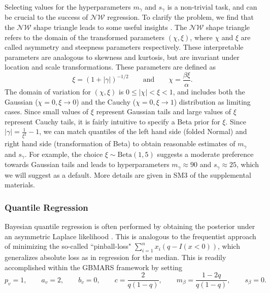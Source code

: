 \documentclass{article} %
\newcommand{\NIG}{\mathcal{NW}}
\begin{document}
Selecting values for the hyperparameters $m_\gamma$ and $s_\gamma$ is a non-trivial task, and can be crucial to the success of $\NIG$ regression. To clarify the problem, we find that the $\NIG$ shape triangle leads to some useful insights \citep{rydberg1997normal}. The $\NIG$ shape triangle refers to the domain of the transformed parameters $(\chi, \xi)$, where $\chi$ and $\xi$ are called asymmetry and steepness parameters respectively. These interpretable parameters are analogous to skewness and kurtosis, but are invariant under location and scale transformations. These parameters are defined as
\begin{equation}
    \label{eq:NIG_triangle}
    \xi = (1+|\gamma|)^{-1/2} \quad\quad\text{and}\quad\quad \chi = \frac{\beta\xi}{\alpha}.
\end{equation}
The domain of variation for $(\chi, \xi)$ is $0 \leq |\chi| < \xi < 1$, and includes both the Gaussian ($\chi=0, \xi \rightarrow 0$) and the Cauchy ($\chi=0, \xi\rightarrow 1$) distribution as limiting cases. Since small values of $\xi$ represent Gaussian tails and large values of $\xi$ represent Cauchy tails, it is fairly intuitive to specify a Beta prior for $\xi$. Since $|\gamma| = \frac{1}{\xi^2} - 1$, we can match quantiles of the left hand side (folded Normal) and right hand side (transformation of Beta) to obtain reasonable estimates of $m_\gamma$ and $s_\gamma$. For example, the choice $\xi \sim \text{Beta}(1, 5)$ suggests a moderate preference towards Gaussian tails and leads to hyperparameters $m_\gamma \approx 90$ and $s_\gamma \approx 25$, which we will suggest as a default. More details are given in SM3 of the supplemental materials. 


\subsubsection{Quantile Regression}
\label{sec:quantileregression}
Bayesian quantile regression is often performed by obtaining the posterior under an asymmetric Laplace likelihood \citep{yu2001bayesian, kotz2012}. This is analogous to the frequentist approach of minimizing the so-called ``pinball-loss" $\sum_{i=1}^nx_i(q - I(x < 0))$, which generalizes absolute loss as in regression for the median. This is readily accomplished within the GBMARS framework by setting
\begin{equation}
    p_v = 1, \quad\quad a_v = 2, \quad\quad b_v = 0, \quad\quad c = \frac{2}{q(1-q)}, \quad\quad m_\beta = \frac{1-2q}{q(1-q)}, \quad\quad s_\beta = 0.
\end{equation}
\end{document}
